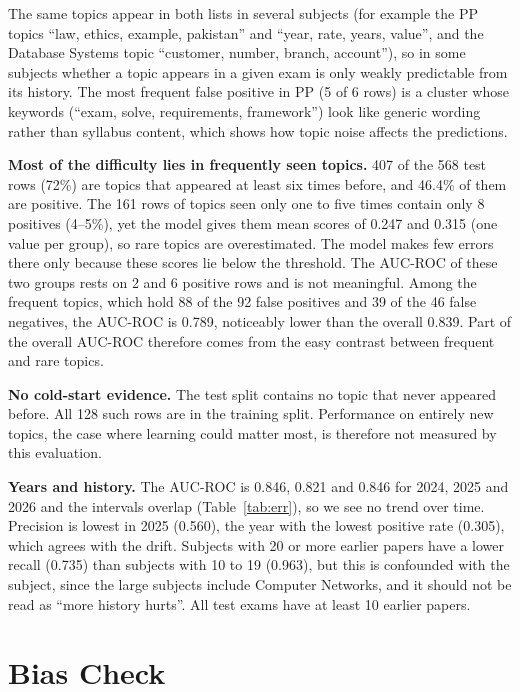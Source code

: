 \documentclass[11pt,a4paper]{article}
\newcommand{\auc}{AUC-ROC}
\begin{document}
The same topics appear in both lists in several subjects (for example the PP topics ``law, ethics, example, pakistan'' and
``year, rate, years, value'', and the Database Systems topic ``customer, number, branch, account''), so in
some subjects whether a topic appears in a given exam is only weakly predictable from its history. The most frequent false
positive in PP (5 of 6 rows) is a cluster whose keywords (``exam, solve, requirements, framework'') look like generic wording
rather than syllabus content, which shows how topic noise affects the predictions.

\textbf{Most of the difficulty lies in frequently seen topics.} 407 of the 568 test rows (72\%) are topics that appeared
at least six times before, and 46.4\% of them are positive. The 161 rows of topics seen only one to five times contain only
8 positives (4--5\%), yet the model gives them mean scores of 0.247 and 0.315 (one value per group), so rare topics are overestimated. The model
makes few errors there only because these scores lie below the threshold. The \auc{} of these two groups rests on 2 and 6
positive rows and is not meaningful. Among the frequent topics, which hold 88 of the 92 false positives and 39 of the 46
false negatives, the \auc{} is 0.789, noticeably lower than the overall 0.839. Part of the overall \auc{} therefore comes
from the easy contrast between frequent and rare topics.

\textbf{No cold-start evidence.} The test split contains no topic that never appeared before. All 128 such rows are in
the training split. Performance on entirely new topics, the case where learning could matter most, is therefore not
measured by this evaluation.

\textbf{Years and history.} The \auc{} is 0.846, 0.821 and 0.846 for 2024, 2025 and 2026 and the intervals overlap (Table~\ref{tab:err}),
so we see no trend over time. Precision is lowest in 2025 (0.560), the year with the lowest positive rate (0.305), which agrees
with the drift. Subjects with 20 or more earlier papers have a lower recall (0.735) than subjects with 10 to 19 (0.963), but this
is confounded with the subject, since the large subjects include Computer Networks, and it should not be read as ``more history
hurts''. All test exams have at least 10 earlier papers.

\section{Bias Check}
\label{sec:bias}
\end{document}
